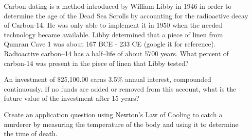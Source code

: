 \documentclass[answers]{exam}
\begin{document}
\begin{questions}
\hfill \break
\hfill \break

\question Carbon dating is a method introduced by William Libby in 1946 in order to determine the age of the Dead Sea Scrolls by accounting for the radioactive decay of Carbon-14. He was only able to implement it in 1950 when the needed technology became available. Libby determined that a piece of linen from Qumran Cave 1 was about 167 BCE - 233 CE (google it for reference). Radioactive carbon–14 has a half–life of about 5700 years. What percent of carbon-14 was present in the piece of linen that Libby tested?

\vfill

\question An investment of \$25,100.00 earns 3.5\% annual interest, compounded continuously. If no funds are added or removed from this account, what is the future value of the investment after 15 years?

\vfill

\question Create an application question using Newton's Law of Cooling to catch a murderer by measuring the temperature of the body and using it to determine the time of death.

\vfill

\end{questions}
\end{document}
